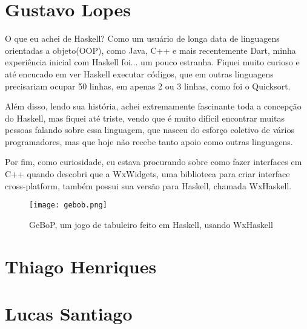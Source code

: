 \documentclass[
  article,			       %
  12pt,				         %
  oneside,			       %
  a4paper,			       %
  english,		       	 %
  brazil,			      	 %
  sumario=tradicional
]{abntex2}
\begin{document}
    
    \begin{apendicesenv}
      
        \partapendices

        \setcounter{chapter}{0}
        \renewcommand{\thechapter}{\Alph{chapter}}%

        \chapter{Gustavo Lopes}

        O que eu achei de Haskell? Como um usuário de longa data de linguagens orientadas a objeto(OOP), 
        como Java, C++ e mais recentemente Dart, minha experiência inicial com Haskell foi...
        um pouco estranha. Fiquei muito curioso e até encucado em ver Haskell executar códigos, que em
        outras linguagens precisariam ocupar 50 linhas, em apenas 2 ou 3 linhas, como foi o Quicksort.

        Além disso, lendo sua história, achei extremamente fascinante toda a concepção do Haskell,
        mas fiquei até triste, vendo que é muito difícil encontrar muitas pessoas falando sobre essa linguagem, que nasceu 
        do esforço coletivo de vários programadores, mas que hoje não recebe tanto apoio como outras linguagens.

        Por fim, como curiosidade, eu estava procurando sobre como fazer interfaces em C++ quando
        descobri que a WxWidgets, uma biblioteca para criar interface cross-platform, também possui 
        sua versão para Haskell, chamada WxHaskell.

        \begin{figure}[ht]
          \texttt{[image: gebob.png]}
          \caption{GeBoP, um jogo de tabuleiro feito em Haskell, usando WxHaskell}
        \end{figure}

        \newpage
        
        \chapter{Thiago Henriques}

        \newpage 

        \chapter{Lucas Santiago}


\end{apendicesenv}
\end{document}
